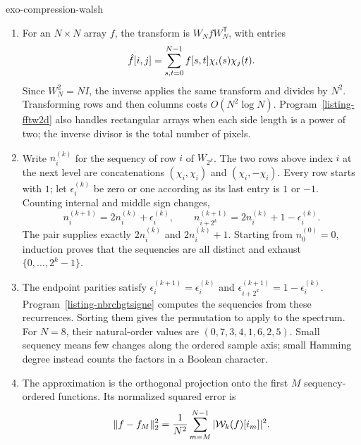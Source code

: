 \begin{correction}{exo-compression-walsh}
\begin{enumerate}
\item For an $N\times N$ array $f$, the transform is $W_NfW_N^{\mathsf T}$,
with entries
\[
 \hat{f}[i,j]=\sum_{s,t=0}^{N-1}f[s,t]\chi_i(s)\chi_j(t).
\]
Since $W_N^2=NI$, the inverse applies the same transform and divides by $N^2$.
Transforming rows and then columns costs $O(N^2\log N)$.
Program~\ref{listing-fftw2d} also handles rectangular arrays when each side
length is a power of two; the inverse divisor is the total number of pixels.
\begin{listing}[H]
\caption{A separable two-dimensional Walsh transform and a sequency approximation.}
\label{listing-fftw2d}
\end{listing}
\item Write $n_i^{(k)}$ for the sequency of row $i$ of $W_{2^k}$.
The two rows above index $i$ at the next level are concatenations
$(\chi_i,\chi_i)$ and $(\chi_i,-\chi_i)$.
Every row starts with $1$; let $\epsilon_i^{(k)}$ be zero or one according
as its last entry is $1$ or $-1$. Counting internal and middle sign changes,
\begin{equation}
\label{eqn-rec-num-change-signs}
 n_i^{(k+1)}=2n_i^{(k)}+\epsilon_i^{(k)},\qquad
 n_{i+2^k}^{(k+1)}=2n_i^{(k)}+1-\epsilon_i^{(k)}.
\end{equation}
The pair supplies exactly $2n_i^{(k)}$ and $2n_i^{(k)}+1$.
Starting from $n_0^{(0)}=0$, induction proves that the sequencies are all
distinct and exhaust $\{0,\ldots,2^k-1\}$.
\item The endpoint parities satisfy
$\epsilon_i^{(k+1)}=\epsilon_i^{(k)}$ and
$\epsilon_{i+2^k}^{(k+1)}=1-\epsilon_i^{(k)}$.
Program~\ref{listing-nbrchgtsigne} computes the sequencies from these
recurrences. Sorting them gives the permutation to apply to the spectrum.
For $N=8$, their natural-order values are $(0,7,3,4,1,6,2,5)$.
Small sequency means few changes along the ordered sample axis; small
Hamming degree instead counts the factors in a Boolean character.
\begin{listing}[H]
\caption{The number of sign changes in each naturally ordered Walsh row.}
\label{listing-nbrchgtsigne}
\end{listing}
\item The approximation is the orthogonal projection onto the first $M$
sequency-ordered functions. Its normalized squared error is
\[
 \lVert f-f_M\rVert_2^2=\frac1{N^2}\sum_{m=M}^{N-1}|\mathcal{W}_k(f)[i_m]|^2.
\]
\end{enumerate}
\end{correction}

